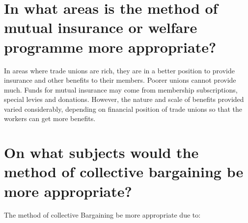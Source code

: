 \section{In what areas is the method of mutual insurance or welfare programme more
appropriate?}


In areas where trade unions are rich, they are in a better position to provide
insurance and other benefits to their members. Poorer unions cannot provide
much.  Funds for mutual insurance may come from membership subscriptions,
special levies and donations. However, the nature and scale of benefits
provided varied considerably, depending on financial position of trade unions
so that the workers can get more benefits.

\section{On what subjects would the method of collective bargaining be more
appropriate?}


The method of collective Bargaining be more appropriate due to:

